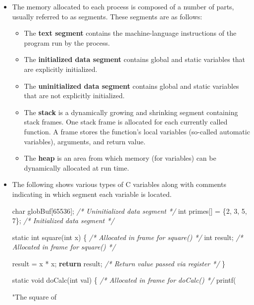 \documentclass[]{article}
\newenvironment{Shaded}{}{}
\newcommand{\DataTypeTok}[1]{\textcolor[rgb]{0.56,0.13,0.00}{#1}}
\newcommand{\DecValTok}[1]{\textcolor[rgb]{0.25,0.63,0.44}{#1}}
\newcommand{\SpecialCharTok}[1]{\textcolor[rgb]{0.25,0.44,0.63}{#1}}
\newcommand{\StringTok}[1]{\textcolor[rgb]{0.25,0.44,0.63}{#1}}
\newcommand{\CommentTok}[1]{\textcolor[rgb]{0.38,0.63,0.69}{\textit{#1}}}
\newcommand{\ControlFlowTok}[1]{\textcolor[rgb]{0.00,0.44,0.13}{\textbf{#1}}}
\newcommand{\NormalTok}[1]{#1}
\begin{document}
\begin{itemize}
\item
  The memory allocated to each process is composed of a number of parts,
  usually referred to as segments. These segments are as follows:

  \begin{itemize}
  \item
    The \textbf{text segment} contains the machine-language instructions
    of the program run by the process. 
  \item
    The \textbf{initialized data segment} contains global and static
    variables that are explicitly initialized. 
  \item
    The \textbf{uninitialized data segment} contains global and static
    variables that are not explicitly initialized. 
  \item
    The \textbf{stack} is a dynamically growing and shrinking segment
    containing stack frames. One stack frame is allocated for each
    currently called function. A frame stores the function's local
    variables (so-called automatic variables), arguments, and return
    value. 
  \item
    The \textbf{heap} is an area from which memory (for variables) can
    be dynamically allocated at run time.
  \end{itemize}
\item
  The following shows various types of C variables along with comments
  indicating in which segment each variable is located.

\begin{Shaded}
\begin{Highlighting}[]
\DataTypeTok{char}\NormalTok{ globBuf[}\DecValTok{65536}\NormalTok{];			}\CommentTok{/* Uninitialized data segment */}
\DataTypeTok{int}\NormalTok{ primes[] = \{}\DecValTok{2}\NormalTok{, }\DecValTok{3}\NormalTok{, }\DecValTok{5}\NormalTok{, }\DecValTok{7}\NormalTok{\};	}\CommentTok{/* Initialized data segment */}

\DataTypeTok{static} \DataTypeTok{int}\NormalTok{ square(}\DataTypeTok{int}\NormalTok{ x) \{		}\CommentTok{/* Allocated in frame for square() */}
    \DataTypeTok{int}\NormalTok{ result;					}\CommentTok{/* Allocated in frame for square() */}
    
\NormalTok{    result = x * x;}
    \ControlFlowTok{return}\NormalTok{ result;				}\CommentTok{/* Return value passed via register */}
\NormalTok{\}}

\DataTypeTok{static} \DataTypeTok{void}\NormalTok{ doCalc(}\DataTypeTok{int}\NormalTok{ val) \{ 	}\CommentTok{/* Allocated in frame for doCalc() */}
\NormalTok{    printf(}\StringTok{"The square of %d is %d}\SpecialCharTok{\textbackslash{}n}\StringTok{"}\NormalTok{, val, square(val));}
    
}
\end{Highlighting}
\end{Shaded}
\end{itemize}
\end{document}
